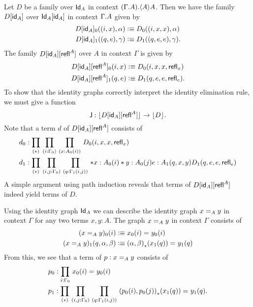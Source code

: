 \begin{defn}
Let $D$ be a family over $\idtypevar{A}$ in context 
$\ctxext{{\Gamma}{A}}{\ctxwk{A}{A}}$. Then we have the family
$\subst{\idfunc[A]}{D}$ over $\subst{\idfunc[A]}{\idtypevar{A}}$ in
context $\ctxext{\Gamma}{A}$ given by
\begin{align*}
\subst{\idfunc[A]}{D}_0(\pairr{i,x},\alpha) & \defeq D_0(\pairr{i,x,x},\alpha)\\
\subst{\idfunc[A]}{D}_1(\pairr{q,e},\gamma) & \defeq D_1(\pairr{q,e,e},\gamma).
\end{align*}
The family $\subst{\reflf{A}}{\subst{\idfunc[A]}{D}}$ over $A$ in
context $\Gamma$ is given by
\begin{align*}
\subst{\reflf{A}}{\subst{\idfunc[A]}{D}}_0(i,x) & \defeq D_0(i,x,x,\refl{x})\\
\subst{\reflf{A}}{\subst{\idfunc[A]}{D}}_1(q,e) & \defeq D_1(q,e,e,\refl{e}).
\end{align*}
To show that the identity graphs correctly interpret the identity elimination
rule, we must give a function
\begin{equation*}
\tfJ : \terms{\subst{\reflf{A}}{\subst{\idfunc[A]}{D}}}\to\terms{D}.
\end{equation*}
Note that a term $d$ of $\subst{\reflf{A}}{\subst{\idfunc[A]}{D}}$
consists of
\begin{align*}
d_0 & : \prd*{i:\Gamma_0}{x:A_0(i)}D_0(i,x,x,\refl{x})\\
d_1 & : \prd*{i,j:\Gamma_0}{q:\Gamma_1(i,j)}*{x:A_0(i)}*{y:A_0(j)}{e:A_1(q,x,y)}D_1(q,e,e,\refl{e})
\end{align*}
A simple argument using path induction reveals that terms of
$\subst{\reflf{A}}{\subst{\idfunc[A]}{D}}$ indeed yield terms of $D$. 
\end{defn}

\begin{rmk}
Using the identity graph $\idtypevar{A}$ we can describe the identity
graph $\id[A]{x}{y}$ in context $\Gamma$ for any two terms $x,y:A$. 
The graph $\id[A]{x}{y}$ in context $\Gamma$ consists of
\begin{align*}
(\id[A]{x}{y})_0(i) & \defeq \id{x_0(i)}{y_0(i)}\\
(\id[A]{x}{y})_1(q,\alpha,\beta) & \defeq \id{\trans{\pairr{\alpha,\beta}}{x_1(q)}}{y_1(q)}
\end{align*}
From this, we see that a term of $p:\id[A]{x}{y}$ consists of
\begin{align*}
p_0 & : \prd{i:\Gamma_0}\id{x_0(i)}{y_0(i)}\\
p_1 & : \prd*{i,j:\Gamma_0}{q:\Gamma_1(i,j)}\id{\trans{\pairr{p_0(i),p_0(j)}}{x_1(q)}}{y_1(q)}.
\end{align*}
\end{rmk}

